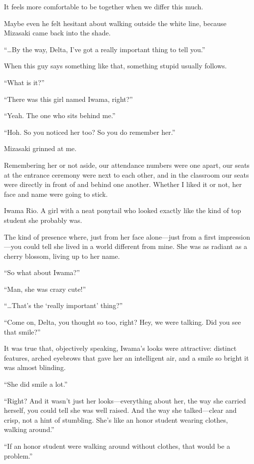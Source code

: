 \documentclass[
    a4paper,
    12pt,
    twoside,
    openany,
    UTF8,
    fontset=windows
]{ctexbook}
\begin{document}
It feels more comfortable to be together when we differ this much.

Maybe even he felt hesitant about walking outside the white line, because Mizasaki came back into the shade.

``\dots By the way, Delta, I've got a really important thing to tell you.''

When this guy says something like that, something stupid usually follows.

``What is it?''

``There was this girl named Iwama, right?''

``Yeah. The one who sits behind me.''

``Hoh. So you noticed her too? So you do remember her.''

Mizasaki grinned at me.

Remembering her or not aside, our attendance numbers were one apart, our seats at the entrance ceremony were next to each other, and in the classroom our seats were directly in front of and behind one another. Whether I liked it or not, her face and name were going to stick.

Iwama Rio. A girl with a neat ponytail who looked exactly like the kind of top student she probably was.

The kind of presence where, just from her face alone---just from a first impression---you could tell she lived in a world different from mine. She was as radiant as a cherry blossom, living up to her name.

``So what about Iwama?''

``Man, she was crazy cute!''

``\dots That's the `really important' thing?''

``Come on, Delta, you thought so too, right? Hey, we were talking. Did you see that smile?''

It was true that, objectively speaking, Iwama's looks were attractive: distinct features, arched eyebrows that gave her an intelligent air, and a smile so bright it was almost blinding.

``She did smile a lot.''

``Right? And it wasn't just her looks---everything about her, the way she carried herself, you could tell she was well raised. And the way she talked---clear and crisp, not a hint of stumbling. She's like an honor student wearing clothes, walking around.''

``If an honor student were walking around without clothes, that would be a problem.''
\end{document}

